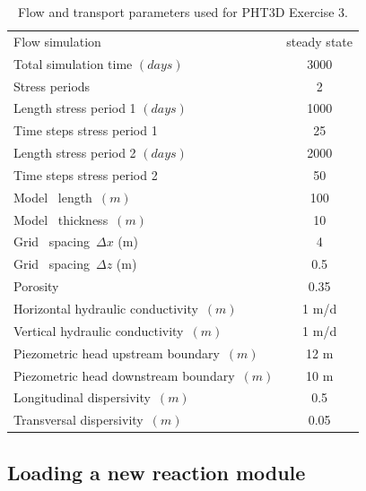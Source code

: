 \begin{table}
\caption{Flow and transport parameters used for PHT3D Exercise 3.}
\begin{center}
\begin{tabular}{lc}
\toprule
Flow simulation                     & steady state \\
Total simulation time $(days)$       & 3000 \\
Stress periods                       & 2 \\
Length stress period 1  $(days)$             & 1000 \\
Time steps stress period 1           & 25 \\
Length stress period 2   $(days)$            & 2000 \\
Time steps stress period 2           & 50 \\
Model \  length\ $ (m)      $         &  100            \\
Model \  thickness\ $ (m)      $         &  10            \\
Grid \ spacing\ $\Delta x $ (m)                &    4            \\
Grid \ spacing\ $\Delta z $ (m)                &    0.5            \\
Porosity\     $            $         &  0.35           \\
Horizontal hydraulic conductivity\ $(m)           $         &  1 m/d         \\ 
Vertical   hydraulic conductivity\ $(m)           $         &  1 m/d         \\ 
Piezometric head upstream boundary\ $(m)          $         &  12 m          \\ 
Piezometric head downstream boundary\ $(m)        $         &  10 m          \\ 
Longitudinal dispersivity\ $(m)         $         &  0.5          \\ 
Transversal  dispersivity\ $(m)         $         &  0.05          \\ 
\bottomrule

\end{tabular}
\label{bruno_flow}
\end{center}
\end{table}

\subsection[Loading a new reaction module]{Loading a new reaction module}

